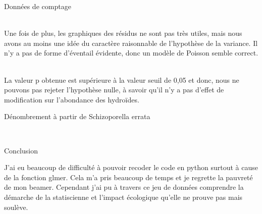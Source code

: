 \documentclass[unknownkeysallowed]{beamer}
\begin{document}
\begin{frame}{Données de comptage}

 \\

Une fois de plus, les graphiques des résidus ne sont pas très utiles, mais nous avons au moins une idée du caractère raisonnable de l’hypothèse de la variance. Il n'y a pas de forme d'éventail évidente, donc un modèle de Poisson semble correct.

 \\
 
 La valeur p obtenue est supérieure à la valeur seuil de 0,05 et donc, nous ne pouvons pas rejeter l'hypothèse nulle, à savoir qu'il n'y a pas d'effet de modification sur l'abondance des hydroïdes.
 
 
\end{frame}


\begin{frame}{Dénombrement à partir de Schizoporella errata}

 \\


    
\end{frame}


\begin{frame}{Conclusion}

J'ai eu beaucoup de difficulté à pouvoir recoder le code en python surtout à cause de la fonction glmer. Cela m'a pris beaucoup de temps et je regrette la pauvreté de mon beamer.
Cependant j'ai pu à travers ce jeu de données comprendre la démarche de la statiscienne et l'impact écologique qu'elle ne prouve pas mais soulève.
    
\end{frame}
\end{document}
